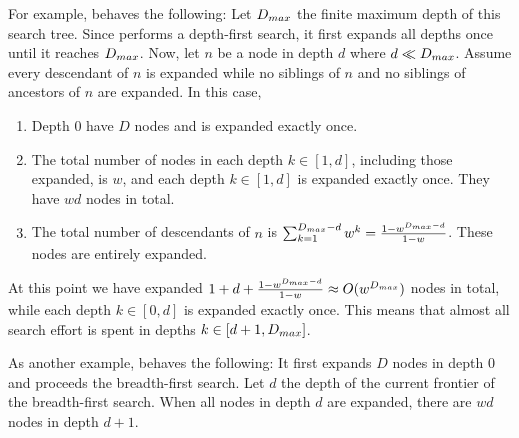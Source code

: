 
For example, \lifo behaves the following: Let $D_{\mit{max}}$ the finite maximum depth of this search tree.
Since \lifo performs a depth-first search, it first expands all depths once until it reaches
$D_{\mit{max}}$.
% 
% 
Now, let $n$ be a node in depth $d$ where $d\ll D_{\mit{max}}$.  Assume every descendant of $n$ is expanded
while no siblings of $n$ and no siblings of ancestors of $n$ are expanded.  In this case,
\begin{enumerate}
 \item Depth 0 have $D$ nodes and is expanded exactly once.
 \item The total number of nodes in each depth $k\in [1,d]$, including those expanded, is $w$, and each depth $k\in [1,d]$ is expanded exactly once. They have $wd$ nodes in total.
 \item The total number of descendants of $n$ is $\sum_{k=1}^{D_{\mit{max}}-d} w^k = \frac{1-w^{D_{\mit{max}}-d}}{1-w}$. These nodes are entirely expanded.
\end{enumerate}
At this point we have expanded $1+d+\frac{1-w^{D_{\mit{max}}-d}}{1-w} \approx O(w^{D_{\mit{max}}})$ nodes in total,
while each depth $k\in [0,d]$ is expanded exactly once.
This means that almost all search effort is spent in depths $k\in [d+1,D_{\mit{max}}]$.

As another example, \fifo behaves the following: It first expands $D$ nodes in depth 0 and proceeds the
breadth-first search. Let $d$ the depth of the current frontier of the breadth-first search. When all nodes in
depth $d$ are expanded, there are $wd$ nodes in depth $d+1$.
